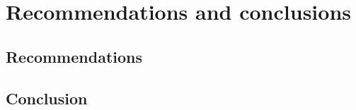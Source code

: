 \section{Recommendations and conclusions}

\subsection{Recommendations}








\subsection{Conclusion}